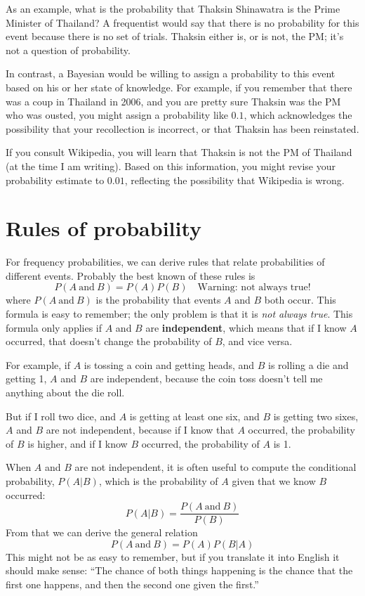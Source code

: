 \documentclass[12pt]{book}
\begin{document}
As an example, what is the probability that Thaksin Shinawatra is the
Prime Minister of Thailand?  A frequentist would say that there is no
probability for this event because there is no set of
trials.  Thaksin either is, or is not, the PM; it's not a question of
probability.

In contrast, a Bayesian would be willing to assign a probability to
this event based on his or her state of knowledge.  For example, if
you remember that there was a coup in Thailand in 2006, and you are
pretty sure Thaksin was the PM who was ousted, you might
assign a probability like $0.1$, which acknowledges the possibility
that your recollection is incorrect, or that Thaksin has been
reinstated.

If you consult Wikipedia, you will learn that Thaksin is not the
PM of Thailand (at the time I am writing).  Based on this
information, you might revise your probability estimate to $0.01$,
reflecting the possibility that Wikipedia is wrong.


\section{Rules of probability}

\newcommand{\AND}{~\mbox{and}~}

For frequency probabilities, we can derive rules that relate
probabilities of different events.  Probably the best known of these
rules is
%
\[ P(A \AND B) = P(A) P(B) \quad \mbox{Warning: not always true!}\]
%
where $P(A \AND B)$ is the probability that events $A$ and $B$ both
occur.  This formula is easy to remember; the only problem is that it
is {\em not always true}.  This formula only applies if $A$ and $B$
are {\bf independent}, which means that if I know $A$ occurred, that
doesn't change the probability of $B$, and vice versa.

For example, if $A$ is tossing a coin and getting heads, and $B$
is rolling a die and getting 1, $A$ and $B$ are independent, because
the coin toss doesn't tell me anything about the die roll.

But if I roll two dice, and $A$ is getting at least one six, and
$B$ is getting two sixes, $A$ and $B$ are not independent, because
if I know that $A$ occurred, the probability of $B$ is higher, and
if I know $B$ occurred, the probability of $A$ is 1.

When $A$ and $B$ are not independent, it is often useful to compute
the conditional probability, $P(A|B)$, which is the probability of
$A$ given that we know $B$ occurred:
%
\[ P(A|B) = \frac{P(A \AND B)}{P(B)} \]
%
From that we can derive the general relation
%
\[ P(A \AND B) = P(A) P(B|A) \]
%
This might not be as easy to remember, but if you translate it into
English it should make sense: ``The chance of both things happening
is the chance that the first one happens, and then the second one
given the first.''
\end{document}
